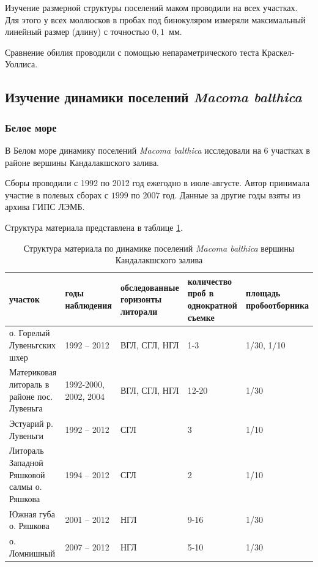 Изучение размерной структуры поселений маком проводили на всех участках.
Для этого у всех моллюсков в пробах под бинокуляром измеряли максимальный линейный размер (длину) с точностью $0,1$~мм.


Сравнение обилия проводили с помощью непараметрического теста Краскел-Уоллиса. 

	\subsection{Изучение динамики поселений {\it Macoma balthica}}
        \subsubsection{Белое море}
В Белом море динамику поселений {\it Macoma balthica} исследовали на $6$ участках в районе вершины Кандалакшского залива. 

Сборы проводили с 1992 по 2012 год ежегодно в июле-августе.
Автор принимала участие в полевых сборах с $1999$ по $2007$ год.
Данные за другие годы взяты из архива ГИПС ЛЭМБ.

Структура материала представлена в таблице \ref{tab:material_Kandalaksha}.
\begin{table}
\caption{Структура материала по динамике поселений {\it Macoma balthica} вершины Кандалакшского залива}
\label{tab:material_Kandalaksha}
    \begin{tabularx}{\textwidth}{|*{5}{X|}} \hline
участок & годы наблюдения & обследованные горизонты литорали & количество проб в однократной съемке & площадь пробоотборника  \\ \hline
о. Горелый Лувеньгских шхер & 1992 -- 2012 & ВГЛ, СГЛ, НГЛ & 1-3 & 1/30, 1/10 \\ \hline
Материковая литораль в районе пос. Лувеньга & 1992-2000, 2002, 2004 & ВГЛ, СГЛ, НГЛ & 12-20 & 1/30 \\ \hline
Эстуарий р. Лувеньги & 1992 -- 2012 & СГЛ & 3 & 1/10 \\ \hline
Литораль Западной Ряшковой салмы о. Ряшкова & 1994 -- 2012 & СГЛ & 2 & 1/10 \\ \hline
Южная губа о. Ряшкова & 2001 -- 2012 & НГЛ & 9-16 & 1/30 \\ \hline
о. Ломнишный & 2007 -- 2012 & НГЛ & 5-10 & 1/30  \\ \hline
\end{tabularx}
\end{table}

